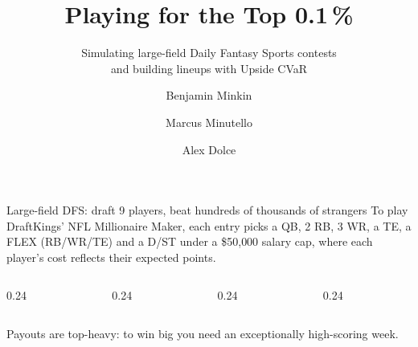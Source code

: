 %
%
%


\graphicspath{{figures/}{../results_nosharks/figures/}}

\title{Playing for the Top 0.1\,\%}
\subtitle{Simulating large-field Daily Fantasy Sports contests\\
  and building lineups with Upside CVaR}
\author{Benjamin Minkin \and Marcus Minutello \and Alex Dolce}
\date{}



\begin{frame}[plain]
  \titlepage
\end{frame}

\begin{frame}{Large-field DFS: draft 9 players, beat hundreds of thousands of strangers}
  To play DraftKings' NFL Millionaire Maker, each entry picks a QB, 2 RB, 3 WR, a TE, a
  FLEX (RB/WR/TE) and a D/ST under a \$50{,}000 salary cap, where each player's cost
  reflects their expected points.
  \vspace{1.6em}

  \begin{columns}[t]
    \begin{column}{0.24\textwidth}
    \end{column}
    \begin{column}{0.24\textwidth}
    \end{column}
    \begin{column}{0.24\textwidth}
    \end{column}
    \begin{column}{0.24\textwidth}
    \end{column}
  \end{columns}
  \vfill
  {\scriptsize\color{navy} Payouts are top-heavy: to win big you need an exceptionally
  high-scoring week.\par}
\end{frame}

